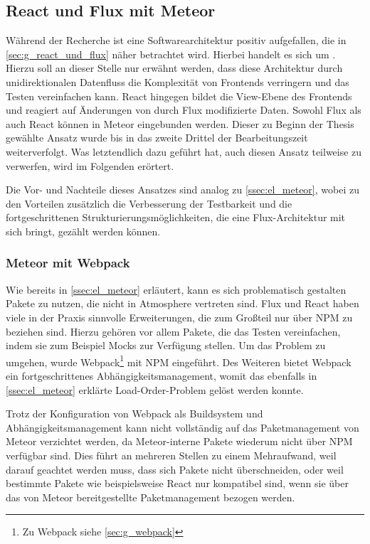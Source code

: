\subsection{React und Flux mit Meteor}
\label{ssec:el_react_und_flux_mit_meteor}

Während der Recherche ist eine Softwarearchitektur positiv aufgefallen, die in
\cref{sec:g_react_und_flux} näher betrachtet wird.  Hierbei handelt es sich um
.  Hierzu soll an dieser Stelle nur erwähnt werden, dass diese
Architektur durch unidirektionalen Datenfluss die Komplexität von Frontends
verringern und das Testen vereinfachen kann.  React hingegen bildet die
View-Ebene des Frontends und reagiert auf Änderungen von durch Flux
modifizierte Daten.  Sowohl Flux als auch React können in Meteor eingebunden
werden.  Dieser zu Beginn der Thesis gewählte Ansatz wurde bis in das zweite
Drittel der Bearbeitungszeit weiterverfolgt.  Was letztendlich dazu geführt hat,
auch diesen Ansatz teilweise zu verwerfen, wird im Folgenden erörtert.

Die Vor- und Nachteile dieses Ansatzes sind analog zu \cref{ssec:el_meteor},
wobei zu den Vorteilen zusätzlich die Verbesserung der Testbarkeit und die
fortgeschrittenen Strukturierungsmöglichkeiten, die eine Flux-Architektur mit
sich bringt, gezählt werden können.

\subsubsection{Meteor mit Webpack}
\label{sssec:elf_meteor_mit_webpack}

Wie bereits in \cref{ssec:el_meteor} erläutert, kann es sich problematisch
gestalten Pakete zu nutzen, die nicht in Atmosphere vertreten sind.  Flux und
React haben viele in der Praxis sinnvolle Erweiterungen, die zum Großteil nur
über NPM zu beziehen sind.  Hierzu gehören vor allem Pakete, die das Testen
vereinfachen, indem sie zum Beispiel Mocks zur Verfügung stellen.  Um das
Problem zu umgehen, wurde Webpack\footnote{Zu Webpack siehe
\cref{sec:g_webpack}} mit NPM eingeführt.  Des Weiteren bietet Webpack ein
fortgeschrittenes Abhängigkeitsmanagement, womit das ebenfalls in
\cref{ssec:el_meteor} erklärte Load-Order-Problem gelöst werden konnte.

Trotz der Konfiguration von Webpack als Buildsystem und Abhängigkeitsmanagement
kann nicht vollständig auf das Paketmanagement von Meteor verzichtet werden, da
Meteor-interne Pakete wiederum nicht über NPM verfügbar sind.  Dies führt an
mehreren Stellen zu einem Mehraufwand, weil darauf geachtet werden muss, dass
sich Pakete nicht überschneiden, oder weil bestimmte Pakete wie beispielsweise
React nur kompatibel sind, wenn sie über das von Meteor bereitgestellte
Paketmanagement bezogen werden.

